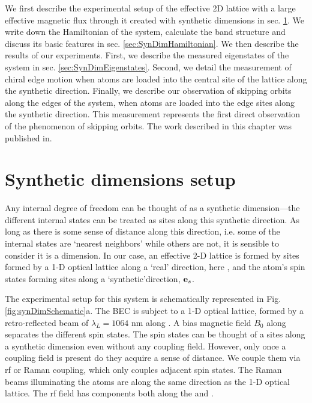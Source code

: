 We first describe the experimental setup of the effective 2D lattice with a large effective magnetic flux through it created with synthetic dimensions in sec. \ref{sec:SynDimSetup}. We write down the Hamiltonian of the system, calculate the band structure and discuss its basic features in sec. \ref{sec:SynDimHamiltonian}. We then describe the results of our experiments. First, we describe the measured eigenstates of the system in sec. \ref{sec:SynDimEigenstates}. Second, we detail the measurement of chiral edge motion when atoms are loaded into the central site of the lattice along the synthetic direction. Finally, we describe our observation of skipping orbits along the edges of the system, when atoms are loaded into the edge sites along the synthetic direction. This measurement represents the first direct observation of the phenomenon of skipping orbits. The work described in this chapter was published in\cite{Stuhl2015}.

\section{Synthetic dimensions setup}\label{sec:SynDimSetup}

Any internal degree of freedom can be thought of as a synthetic dimension---the different internal states can be treated as sites along this synthetic direction. As long as there is some sense of distance along this direction, i.e. some of the internal states are \lq{nearest neighbors}\rq{} while others are not, it is sensible to consider it is a dimension. In our case, an effective 2-D lattice is formed by sites formed by a 1-D optical lattice along a \lq{real}\rq{} direction, here  \ex{}, and the atom's spin states forming sites along a \lq{synthetic}\rq direction,  $\textbf{e}_s{}$. 

The experimental setup for this system is schematically represented in Fig. \ref{fig:synDimSchematic}a. The BEC is subject to a 1-D optical lattice, formed by a retro-reflected beam of $\lambda_L=1064$ nm along  \ex{}. A bias magnetic field $B_0$ along  \ez{} separates the different spin states. The spin states can be thought of a sites along a synthetic dimension even without any coupling field. However, only once a coupling field is present do they acquire a sense of distance. We couple them via rf or Raman coupling, which only couples adjacent spin states. The Raman beams illuminating the atoms are along the same  \ex{} direction as the 1-D optical lattice. The rf field has components both along the  \ex{} and \ey{}. 



